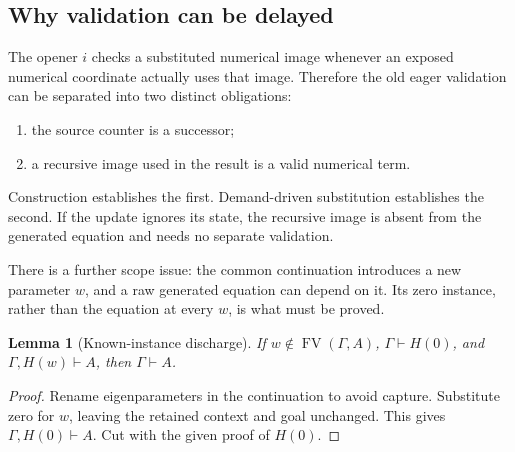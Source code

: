 \documentclass[11pt,letterpaper]{article}
\newtheorem{lemma}[theorem]{Lemma}
\theoremstyle{definition}\newtheorem{definition}[theorem]{Definition}
\theoremstyle{remark}\newtheorem{remark}[theorem]{Remark}
\newcommand{\FV}{\operatorname{FV}}
\begin{document}
\subsection{Why validation can be delayed}

The opener $i$ checks a substituted numerical image whenever an exposed
numerical coordinate actually uses that image. Therefore the old eager
validation can be separated into two distinct obligations:
\begin{enumerate}
\item the source counter is a successor;
\item a recursive image used in the result is a valid numerical term.
\end{enumerate}
Construction establishes the first. Demand-driven substitution establishes
the second. If the update ignores its state, the recursive image is absent
from the generated equation and needs no separate validation.

There is a further scope issue: the common continuation introduces a new
parameter $w$, and a raw generated equation can depend on it. Its zero
instance, rather than the equation at every $w$, is what must be proved.

\begin{lemma}[Known-instance discharge]
\label{lem:known-instance}
If $w\notin\FV(\Gamma,A)$, $\Gamma\vdash H(0)$, and
$\Gamma,H(w)\vdash A$, then $\Gamma\vdash A$.
\end{lemma}
\begin{proof}
Rename eigenparameters in the continuation to avoid capture. Substitute
zero for $w$, leaving the retained context and goal unchanged. This gives
$\Gamma,H(0)\vdash A$. Cut with the given proof of $H(0)$.
\end{proof}
\end{document}
